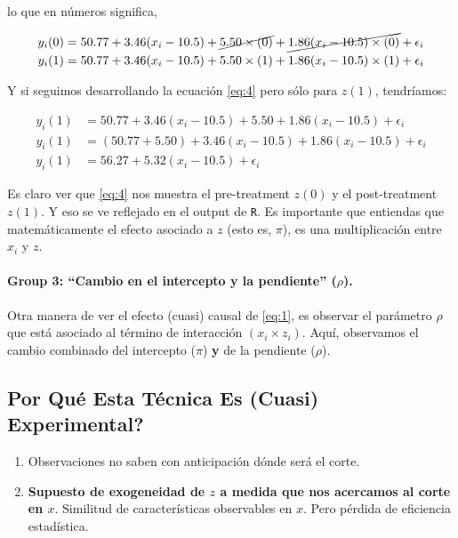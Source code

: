 \documentclass[10pt]{article}
\begin{document}
lo que en n\'umeros significa,

\begin{equation} \label{eq:4}
\begin{split}
y_{i}(0) &= 50.77 + 3.46(x_{i}-10.5) + \cancel{5.50\times(0)} + \cancel{1.86(x_{i}-10.5) \times (0)} +  \epsilon_{i} \\
y_{i}(1) &= 50.77 + 3.46(x_{i}-10.5) + 5.50\times(1) + 1.86(x_{i}-10.5) \times (1) +  \epsilon_{i}
\end{split}
\end{equation}

Y si seguimos desarrollando la ecuaci\'on \autoref{eq:4} pero s\'olo para $z(1)$, tendr\'iamos:

\begin{equation} \label{eq:5}
\begin{split}
y_{i}(1) &= 50.77 + 3.46(x_{i}-10.5) + 5.50 + 1.86(x_{i}-10.5) +  \epsilon_{i}\\
y_{i}(1) &= (50.77+5.50) + 3.46(x_{i}-10.5) + 1.86(x_{i}-10.5) +  \epsilon_{i}\\
y_{i}(1) &= 56.27 + 5.32(x_{i}-10.5) +  \epsilon_{i}
\end{split}
\end{equation}

Es claro ver que \autoref{eq:4} nos muestra el pre-treatment $z(0)$ y el post-treatment $z(1)$. Y eso se ve reflejado en el output de \texttt{R}. Es importante que entiendas que matem\'aticamente el efecto asociado a $z$ (esto es, $\pi$), es una multiplicaci\'on entre $x_{i}$ y $z$.

\paragraph{Group 3: ``Cambio en el intercepto y la pendiente'' ($\rho$).} Otra manera de ver el efecto (cuasi) causal de \autoref{eq:1}, es observar el par\'ametro $\rho$ que est\'a asociado al t\'ermino de interacci\'on $(x_{i}\times z_{i})$. Aqu\'i, observamos el cambio combinado del intercepto ($\pi$) {\bf y} de la pendiente ($\rho$).

\subsection*{Por Qu\'e Esta T\'ecnica Es (Cuasi) Experimental?}

\begin{enumerate}
	\item Observaciones no saben con anticipaci\'on d\'onde ser\'a el corte.
	\item {\bf Supuesto de exogeneidad de $z$ a medida que nos acercamos al corte en $x$}.  Similitud de caracter\'isticas observables en $x$. Pero p\'erdida de eficiencia estad\'istica.
\end{enumerate}
\end{document}
